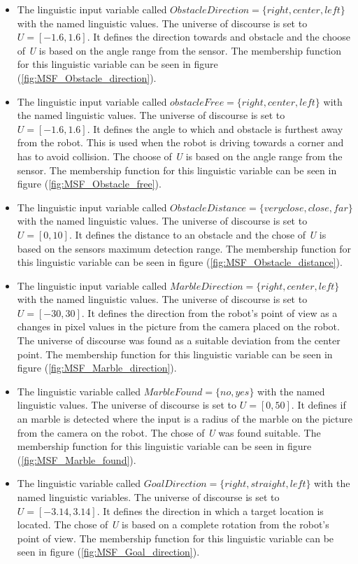 \documentclass[../Head/Main.tex]{subfiles}
\begin{document}
\begin{itemize}
\item The linguistic input variable called $ObstacleDirection = \{right, center, left\}$ with the named linguistic values. The universe of discourse is set to ${U} = [-1.6, 1.6]$. It defines the direction towards and obstacle and the choose of \textit{U} is based on the angle range from the sensor. The membership function for this linguistic variable can be seen in figure (\ref{fig:MSF_Obstacle_direction}).
\item The linguistic input variable called $obstacleFree = \{right, center, left\}$ with the named linguistic values. The universe of discourse is set to ${U} = [-1.6, 1.6]$. It defines the angle to which and obstacle is furthest away from the robot. This is used when the robot is driving towards a corner and has to avoid collision. The choose of \textit{U} is based on the angle range from the sensor. The membership function for this linguistic variable can be seen in figure (\ref{fig:MSF_Obstacle_free}).
\item The linguistic input variable called $ObstacleDistance = \{veryclose, close, far\}$ with the named linguistic values.  The universe of discourse is set to ${U} = [0, 10]$. It defines the distance to an obstacle and the chose of \textit{U} is based on the sensors maximum detection range. The membership function for this linguistic variable can be seen in figure (\ref{fig:MSF_Obstacle_distance}).
\item The linguistic input variable called $MarbleDirection = \{right, center, left\}$ with the named linguistic values. The universe of discourse is set to ${U} = [-30, 30]$. It defines the direction from the robot's point of view as a changes in pixel values in the picture from the camera placed on the robot. The universe of discourse was found as a suitable deviation from the center point. The membership function for this linguistic variable can be seen in figure (\ref{fig:MSF_Marble_direction}).
\item The linguistic variable called $MarbleFound = \{no, yes\}$ with the named linguistic values.  The universe of discourse is set to ${U} = [0, 50]$. It defines if an marble is detected where the input is a radius of the marble on the picture from the camera on the robot. The chose of \textit{U} was found suitable. The membership function for this linguistic variable can be seen in figure (\ref{fig:MSF_Marble_found}).
\item The linguistic variable called $GoalDirection = \{right, straight, left\}$ with the named linguistic variables. The universe of discourse is set to ${U} = [-3.14, 3.14]$. It defines the direction in which a target location is located. The chose of \textit{U} is based on a complete rotation from the robot's point of view. The membership function for this linguistic variable can be seen in figure (\ref{fig:MSF_Goal_direction}).

\end{itemize}
\end{document}
